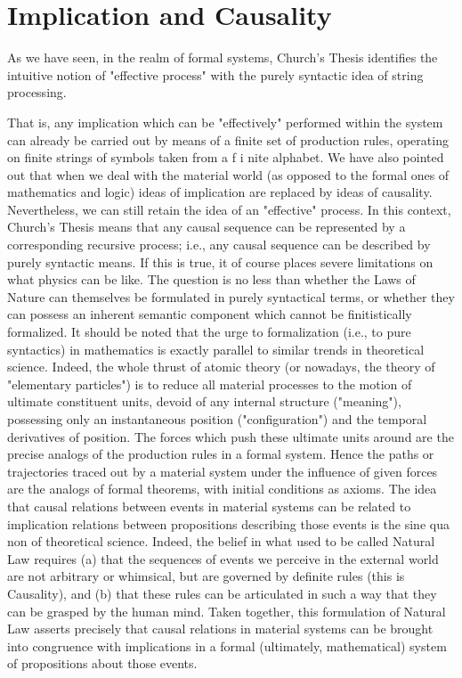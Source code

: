 \documentclass[a4paper,12pt]{article}
\begin{document}
\section{Implication and Causality}

As we have seen, in the realm of formal systems, Church's Thesis identifies the intuitive notion of "effective process" with the purely syntactic idea of string processing.

That is, any implication which can be "effectively" performed within the system can already be carried out by means of a finite set of production rules,
operating on finite strings of symbols taken from a f i nite alphabet. We have also pointed out that when we deal with the material world
(as opposed to the formal ones of mathematics and logic) ideas of implication are replaced by ideas of causality. Nevertheless, we can still
retain the idea of an "effective" process. In this context, Church's Thesis means that any causal sequence can be represented by a corresponding
recursive process; i.e., any causal sequence can be described by purely syntactic means. If this is true, it of course places severe
limitations on what physics can be like. The question is no less than whether the Laws of Nature can themselves be formulated in purely
syntactical terms, or whether they can possess an inherent semantic component which cannot be finitistically formalized.
It should be noted that the urge to formalization (i.e., to pure syntactics) in mathematics is exactly parallel to similar trends in theoretical science.
Indeed, the whole thrust of atomic theory (or nowadays, the theory of "elementary particles") is to reduce all material processes to the motion of
ultimate constituent units, devoid of any internal structure ("meaning"), possessing only an instantaneous position ("configuration")
and the temporal derivatives of position. The forces which push these ultimate units around are the precise analogs of the production rules in a formal system.
Hence the paths or trajectories traced out by a material system under the influence of given forces are the analogs of formal theorems,
with initial conditions as axioms. The idea that causal relations between events in material systems can be related to implication relations between
propositions describing those events is the sine qua non of theoretical science. Indeed, the belief in what used to be called Natural Law requires (a)
that the sequences of events we perceive in the external world are not arbitrary or whimsical, but are governed by definite rules (this is Causality),
and (b) that these rules can be articulated in such a way that they can be grasped by the human mind. Taken together, this formulation of Natural Law
asserts precisely that causal relations in material systems can be brought into congruence with implications in a
formal (ultimately, mathematical) system of propositions about those events.
\end{document}

